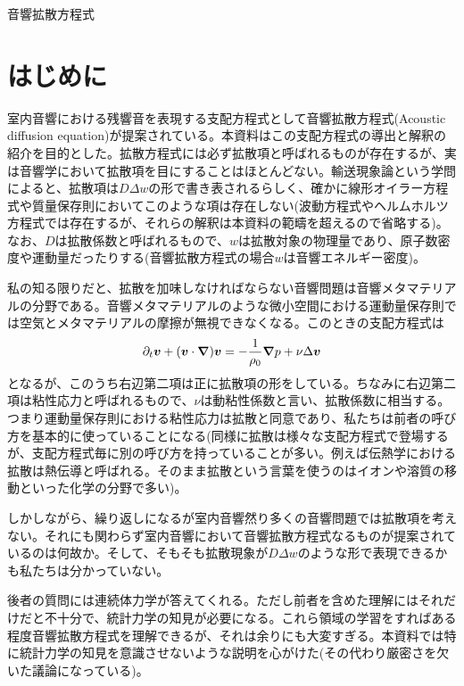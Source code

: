 \documentclass[dvipdfmx, 9pt, a4paper]{jsarticle}
\newcommand{\bm}[1]{{\mbox{\boldmath $#1$}}}
\begin{document}
\begin{center}
{\fontsize{18pt}{1pt}\selectfont 音響拡散方程式}\\
\end{center}
\section*{はじめに}
室内音響における残響音を表現する支配方程式として音響拡散方程式(Acoustic diffusion equation)が提案されている。本資料はこの支配方程式の導出と解釈の紹介を目的とした。拡散方程式には必ず拡散項と呼ばれるものが存在するが、実は音響学において拡散項を目にすることはほとんどない。輸送現象論という学問によると、拡散項は$D\Delta w$の形で書き表されるらしく、確かに線形オイラー方程式や質量保存則においてこのような項は存在しない(波動方程式やヘルムホルツ方程式では存在するが、それらの解釈は本資料の範疇を超えるので省略する)。なお、$D$は拡散係数と呼ばれるもので、$w$は拡散対象の物理量であり、原子数密度や運動量だったりする(音響拡散方程式の場合$w$は音響エネルギー密度)。\par
私の知る限りだと、拡散を加味しなければならない音響問題は音響メタマテリアルの分野である。音響メタマテリアルのような微小空間における運動量保存則では空気とメタマテリアルの摩擦が無視できなくなる。このときの支配方程式は
\begin{equation}
\partial_t\bm v+(\bm v\cdot \bm \nabla)\bm v=-\frac{1}{\rho_0}\bm \nabla p+\nu \Delta \bm v \notag
\end{equation}
となるが、このうち右辺第二項は正に拡散項の形をしている。ちなみに右辺第二項は粘性応力と呼ばれるもので、$\nu$は動粘性係数と言い、拡散係数に相当する。つまり運動量保存則における粘性応力は拡散と同意であり、私たちは前者の呼び方を基本的に使っていることになる(同様に拡散は様々な支配方程式で登場するが、支配方程式毎に別の呼び方を持っていることが多い。例えば伝熱学における拡散は熱伝導と呼ばれる。そのまま拡散という言葉を使うのはイオンや溶質の移動といった化学の分野で多い)。\par
しかしながら、繰り返しになるが室内音響然り多くの音響問題では拡散項を考えない。それにも関わらず室内音響において音響拡散方程式なるものが提案されているのは何故か。そして、そもそも拡散現象が$D\Delta w$のような形で表現できるかも私たちは分かっていない。\par
後者の質問には連続体力学が答えてくれる。ただし前者を含めた理解にはそれだけだと不十分で、統計力学の知見が必要になる。これら領域の学習をすればある程度音響拡散方程式を理解できるが、それは余りにも大変すぎる。本資料では特に統計力学の知見を意識させないような説明を心がけた(その代わり厳密さを欠いた議論になっている)。
\end{document}
